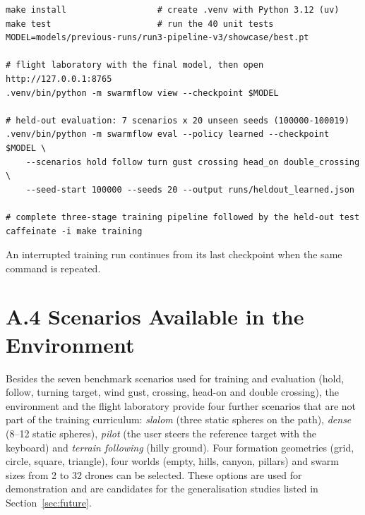 {\small
\begin{verbatim}
make install                  # create .venv with Python 3.12 (uv)
make test                     # run the 40 unit tests
MODEL=models/previous-runs/run3-pipeline-v3/showcase/best.pt

# flight laboratory with the final model, then open http://127.0.0.1:8765
.venv/bin/python -m swarmflow view --checkpoint $MODEL

# held-out evaluation: 7 scenarios x 20 unseen seeds (100000-100019)
.venv/bin/python -m swarmflow eval --policy learned --checkpoint $MODEL \
    --scenarios hold follow turn gust crossing head_on double_crossing \
    --seed-start 100000 --seeds 20 --output runs/heldout_learned.json

# complete three-stage training pipeline followed by the held-out test
caffeinate -i make training
\end{verbatim}
}

\noindent An interrupted training run continues from its last checkpoint when the same command is repeated.

\section*{A.4 Scenarios Available in the Environment}
Besides the seven benchmark scenarios used for training and evaluation (hold, follow, turning target, wind gust,
crossing, head-on and double crossing), the environment and the flight laboratory provide four further
scenarios that are not part of the training curriculum: \emph{slalom} (three static spheres on the path),
\emph{dense} (8--12 static spheres), \emph{pilot} (the user steers the reference target with the keyboard) and
\emph{terrain following} (hilly ground). Four formation geometries (grid, circle, square, triangle), four worlds
(empty, hills, canyon, pillars) and swarm sizes from 2 to 32 drones can be selected. These options are used for
demonstration and are candidates for the generalisation studies listed in Section~\ref{sec:future}.

